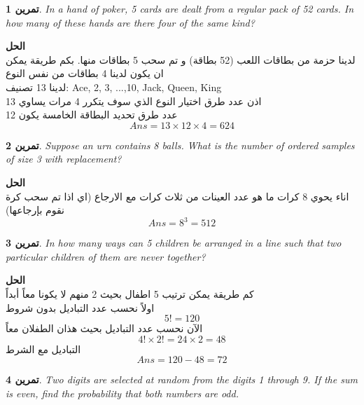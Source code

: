 \documentclass[14pt, a4paper, leqno]{extarticle}
\newcommand{\en}{\textenglish}
\theoremstyle{theoremstyle}
\newtheorem{example}{تمرين}
\newenvironment{solution}{\noindent\textbf{الحل}\vspace{3pt}\\}{}
\begin{document}
	\begin{example}
		\en{In a hand of poker, 5 cards are dealt from a regular pack of 52 cards. In how many of these hands are there four of the same kind?}
	\end{example}
	
	\begin{solution}
		لدينا حزمة من بطاقات اللعب (52 بطاقة) و تم سحب 5 بطاقات منها. بكم طريقة يمكن ان يكون لدينا 4 بطاقات من نفس النوع\\
		لدينا 13 تصنيف: \en{Ace, 2, 3, ...,10, Jack, Queen, King}\\
		اذن عدد طرق اختيار النوع الذي سوف يتكرر 4 مرات يساوي 13\\
		عدد طرق تحديد البطاقة الخامسة يكون 12\\
		\[
		\textit{Ans} = 13 \times 12 \times 4 = 624
		\]
	\end{solution}
	
	\begin{example}
		\en{Suppose an urn contains 8 balls. What is the number of ordered samples of size 3 with replacement?}
	\end{example}
	
	\begin{solution}
		اناء يحوي 8 كرات ما هو عدد العينات من ثلاث كرات مع الارجاع (اي اذا تم سحب كرة نقوم بإرجاعها)
		\[
		\textit{Ans} = 8^3 = 512
		\]
	\end{solution}
	
	\begin{example}
		\en{In how many ways can 5 children be arranged in a line such that two particular children of them are never together?}
	\end{example}
	
	\begin{solution}
		كم طريقة يمكن ترتيب 5 اطفال بحيث 2 منهم لا يكونا معاً أبداً\\
		اولاً نحسب عدد التباديل بدون شروط
		\[
		5! = 120
		\]
		الآن نحسب عدد التباديل بحيث هذان الطفلان معاً
		\[
		4! \times 2! = 24 \times 2 = 48
		\]
		التباديل مع الشرط
		\[
		\textit{Ans} = 120 - 48 = 72
		\]
	\end{solution}
	
	\begin{example}
		\en{Two digits are selected at random from the digits 1 through 9. If the sum is even, find the probability that both numbers are odd.}
	\end{example}
	
\end{document}
